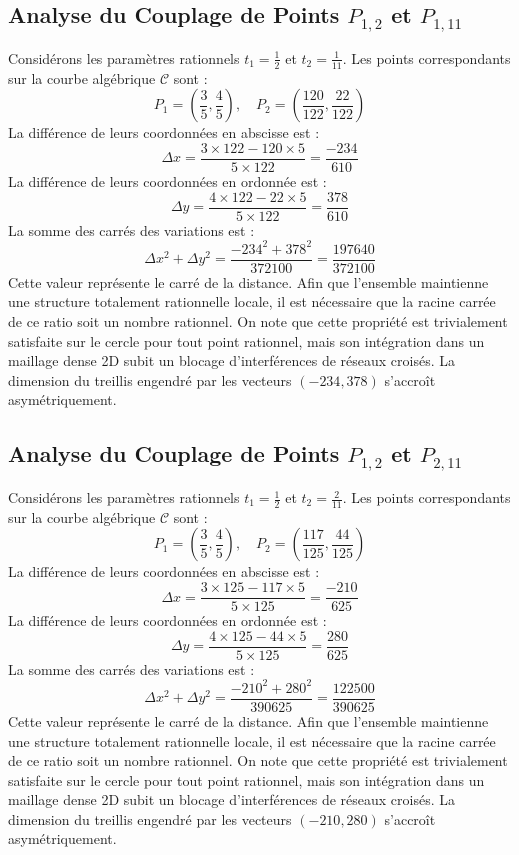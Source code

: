 \documentclass[12pt, a4paper]{article}
\begin{document}
\subsection{Analyse du Couplage de Points $P_{1,2}$ et $P_{1,11}$}
Considérons les paramètres rationnels $t_1 = \frac{1}{2}$ et $t_2 = \frac{1}{11}$.
Les points correspondants sur la courbe algébrique $\mathcal{C}$ sont :
$$ P_1 = \left( \frac{3}{5}, \frac{4}{5} \right), \quad P_2 = \left( \frac{120}{122}, \frac{22}{122} \right) $$
La différence de leurs coordonnées en abscisse est :
$$ \Delta x = \frac{3 \times 122 - 120 \times 5}{5 \times 122} = \frac{-234}{610} $$
La différence de leurs coordonnées en ordonnée est :
$$ \Delta y = \frac{4 \times 122 - 22 \times 5}{5 \times 122} = \frac{378}{610} $$
La somme des carrés des variations est :
$$ \Delta x^2 + \Delta y^2 = \frac{ -234^2 + 378^2 }{ 372100 } = \frac{ 197640 }{ 372100 } $$
Cette valeur représente le carré de la distance. Afin que l'ensemble maintienne une structure totalement rationnelle locale, il est nécessaire que la racine carrée de ce ratio soit un nombre rationnel. On note que cette propriété est trivialement satisfaite sur le cercle pour tout point rationnel, mais son intégration dans un maillage dense 2D subit un blocage d'interférences de réseaux croisés. La dimension du treillis engendré par les vecteurs $( -234, 378 )$ s'accroît asymétriquement.


\subsection{Analyse du Couplage de Points $P_{1,2}$ et $P_{2,11}$}
Considérons les paramètres rationnels $t_1 = \frac{1}{2}$ et $t_2 = \frac{2}{11}$.
Les points correspondants sur la courbe algébrique $\mathcal{C}$ sont :
$$ P_1 = \left( \frac{3}{5}, \frac{4}{5} \right), \quad P_2 = \left( \frac{117}{125}, \frac{44}{125} \right) $$
La différence de leurs coordonnées en abscisse est :
$$ \Delta x = \frac{3 \times 125 - 117 \times 5}{5 \times 125} = \frac{-210}{625} $$
La différence de leurs coordonnées en ordonnée est :
$$ \Delta y = \frac{4 \times 125 - 44 \times 5}{5 \times 125} = \frac{280}{625} $$
La somme des carrés des variations est :
$$ \Delta x^2 + \Delta y^2 = \frac{ -210^2 + 280^2 }{ 390625 } = \frac{ 122500 }{ 390625 } $$
Cette valeur représente le carré de la distance. Afin que l'ensemble maintienne une structure totalement rationnelle locale, il est nécessaire que la racine carrée de ce ratio soit un nombre rationnel. On note que cette propriété est trivialement satisfaite sur le cercle pour tout point rationnel, mais son intégration dans un maillage dense 2D subit un blocage d'interférences de réseaux croisés. La dimension du treillis engendré par les vecteurs $( -210, 280 )$ s'accroît asymétriquement.
\end{document}
